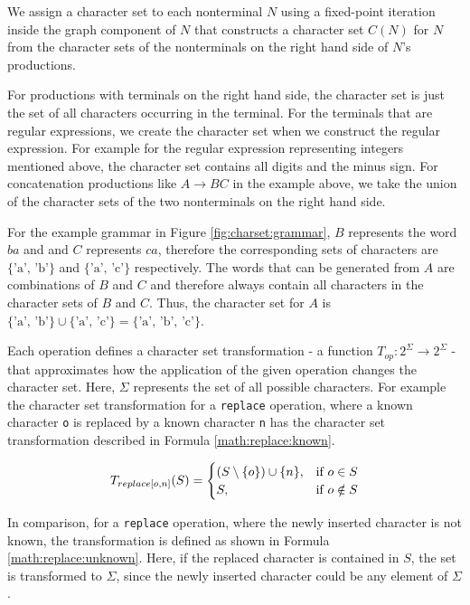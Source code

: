 We assign a character set to each nonterminal $N$ using a fixed-point iteration inside the graph component of $N$ that constructs a character set $C(N)$ for $N$ from the character sets of the nonterminals on the right hand side of $N$'s productions.

For productions with terminals on the right hand side, the character set is just the set of all characters occurring in the terminal. For the terminals that are regular expressions, we create the character set when we construct the regular expression. For example for the regular expression representing integers mentioned above, the character set contains all digits and the minus sign.
For concatenation productions like $A \rightarrow BC$ in the example above, we take the union of the character sets of the two nonterminals on the right hand side.

For the example grammar in Figure \ref{fig:charset:grammar}, $B$ represents the word $ba$ and and $C$ represents $ca$, therefore the corresponding sets of characters are  $\{\text{'a', 'b'}\}$ and  $\{\text{'a', 'c'}\}$ respectively. The words that can be generated from $A$ are combinations of $B$ and $C$ and therefore always contain all characters in the character sets of $B$ and $C$. Thus, the character set for $A$ is $\{\text{'a', 'b'}\} \cup \{\text{'a', 'c'}\} = \{\text{'a', 'b', 'c'}\}$.

Each operation defines a character set transformation - a function $T_{op} : 2^\Sigma \rightarrow 2^\Sigma$ - that approximates how the application of the given operation changes the character set. Here, $\Sigma$ represents the set of all possible characters.
For example the character set transformation for a \lstinline|replace| operation, where a known character \lstinline|o| is replaced by a known character \lstinline|n| has the character set transformation described in Formula \ref{math:replace:known}.

\begin{align}
	\centering
	T_{replace[o, n]}(S) = 
	\begin{cases}
		(S \setminus \{o\}) \cup \{n\}, & \text{if } o \in S\\
		S, & \text{if } o \notin S
	\end{cases}
	\label{math:replace:known}
\end{align}

In comparison, for a \lstinline|replace| operation, where the newly inserted character is not known, the transformation is defined as shown in Formula \ref{math:replace:unknown}. Here, if the replaced character is contained in $S$, the set is transformed to $\Sigma$, since the newly inserted character could be any element of $\Sigma$.

